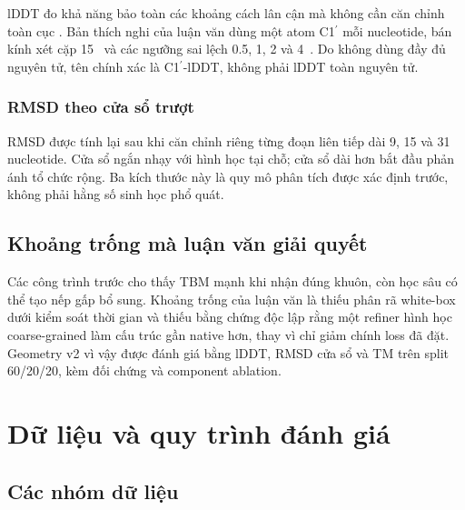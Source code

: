 \documentclass[12pt,a4paper,oneside]{report}
\newcommand{\cprime}{C1$^{\prime}$}
\newcommand{\angstrom}{\text{\AA}}
\begin{document}
lDDT đo khả năng bảo toàn các khoảng cách lân cận mà không cần căn chỉnh toàn cục
\cite{lddt}. Bản thích nghi của luận văn dùng một atom \cprime{} mỗi nucleotide, bán
kính xét cặp 15~\angstrom{} và các ngưỡng sai lệch 0.5, 1, 2 và 4~\angstrom{}. Do không
dùng đầy đủ nguyên tử, tên chính xác là \cprime{}-lDDT, không phải lDDT toàn nguyên tử.

\subsection{RMSD theo cửa sổ trượt}

RMSD được tính lại sau khi căn chỉnh riêng từng đoạn liên tiếp dài 9, 15 và 31
nucleotide. Cửa sổ ngắn nhạy với hình học tại chỗ; cửa sổ dài hơn bắt đầu phản ánh tổ
chức rộng. Ba kích thước này là quy mô phân tích được xác định trước, không phải hằng số
sinh học phổ quát.

\section{Khoảng trống mà luận văn giải quyết}

Các công trình trước cho thấy TBM mạnh khi nhận đúng khuôn, còn học sâu có thể tạo nếp
gấp bổ sung. Khoảng trống của luận văn là thiếu phân rã white-box dưới kiểm soát thời
gian và thiếu bằng chứng độc lập rằng một refiner hình học coarse-grained làm cấu trúc
gần native hơn, thay vì chỉ giảm chính loss đã đặt. Geometry v2 vì vậy được đánh giá
bằng lDDT, RMSD cửa sổ và TM trên split 60/20/20, kèm đối chứng và component ablation.

\chapter{Dữ liệu và quy trình đánh giá}

\section{Các nhóm dữ liệu}
\end{document}
